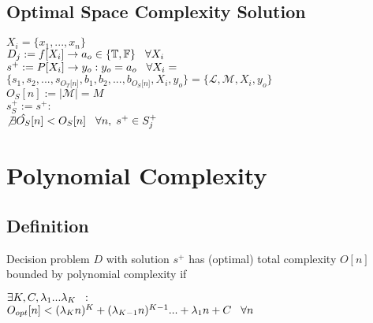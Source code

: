\documentclass[11pt]{article}
\begin{document}
\subsection{Optimal Space Complexity Solution}

\begin{center}
$
X_i = \{x_1,...,x_n\}
$
\\ \vspace{2mm}
$
D_j := f \lbrack X_i \rbrack \rightarrow a_{o} \in \{\mathbb{T}, \mathbb{F}\} \hspace{3mm} \forall X_i
$
\\ \vspace{2mm}
$
s^+ := P \lbrack X_i \rbrack \rightarrow y_{o} : y_o = a_{o} \hspace{3mm} \forall X_i = 
$
\\ \vspace{2mm}
$
\{ s_1,s_2,...,s_{O_T \lbrack n \rbrack }, b_1, b_2,...,b_{O_S \lbrack n \rbrack},X_i,y_o \} = \{ \mathcal{L},\mathcal{M},X_i,y_o\}
$
\\ \vspace{3mm}
$
O_S[n] := |\mathcal{M}| = M
$
\\ \vspace{2mm}
$
s_{S}^+ := s^+ :
$
\\ \vspace{2mm}
$
\not \exists \hat{O_S} \lbrack n \rbrack < O_{S}[n] \hspace{3mm} \forall n, \hspace{1mm}  s^+ \in S_j^+
$
\end{center}






















\newpage
\section{Polynomial Complexity}

\subsection{Definition}
Decision problem $D$ with solution $s^+$ has (optimal) total complexity $O[n]$ bounded by polynomial complexity if
\begin{center}
$\exists K,C,\lambda_1...\lambda_K \hspace{2mm} :$
\\ \vspace{2mm}
$O_{opt}[n] < (\lambda_K n)^K + (\lambda_{K-1} n)^{K-1}... + \lambda_1 n + C \hspace{3mm} \forall n$
\end{center}
\end{document}
